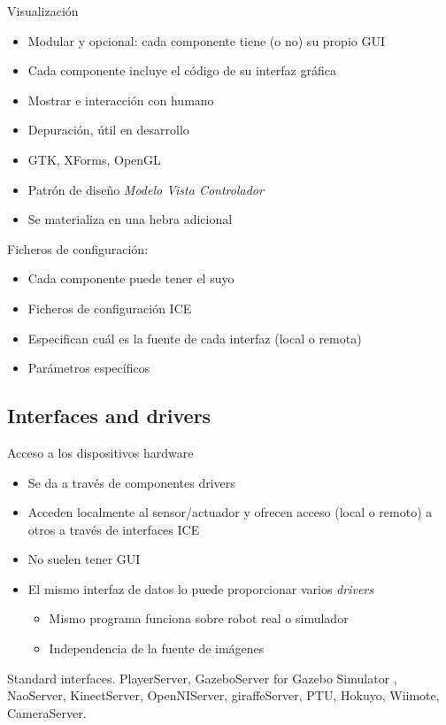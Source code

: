 \documentclass[twocolumn]{svjour3}          %
\begin{document}
Visualización
\begin{itemize}
\item {Modular} y {opcional}: cada componente tiene (o no) su propio GUI
\item Cada componente incluye el código de su interfaz gráfica
\item Mostrar e interacción con humano 
\item Depuración, útil en desarrollo
\item GTK, XForms, OpenGL
\item Patrón de diseño \textit{Modelo Vista Controlador}
\item Se materializa en una {hebra adicional}
\end{itemize}



Ficheros de configuración:
\begin{itemize}
\item Cada componente puede tener el suyo 
\item Ficheros de configuración ICE
\item Especifican cuál es la fuente de cada interfaz (local o remota)
\item Parámetros específicos
\end{itemize}

\subsection{Interfaces and drivers}


Acceso a los dispositivos hardware
\begin{itemize}
\item Se da a través de {componentes drivers}
\item Acceden localmente al sensor/actuador y ofrecen acceso (local o remoto) a otros a través de interfaces ICE
\item No suelen tener GUI
\item El mismo interfaz de datos lo puede proporcionar varios \textit{drivers}
\begin{itemize}
\item Mismo programa funciona sobre robot real o simulador
\item Independencia de la fuente de imágenes
\end{itemize}
\end{itemize}


Standard interfaces. 
PlayerServer, GazeboServer for Gazebo Simulator \cite{koening2004}, NaoServer, KinectServer, OpenNIServer, giraffeServer, PTU, Hokuyo, Wiimote, CameraServer.
\end{document}
